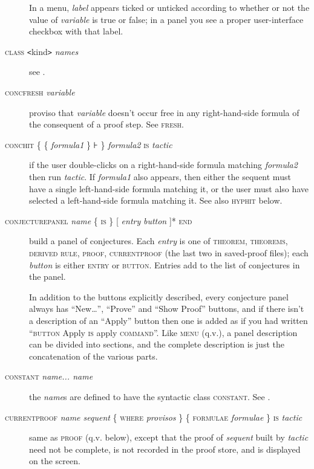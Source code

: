 \begin{description}
In a menu, \textit{label} appears ticked or unticked according to whether or not the value of \textit{variable} is true or false; in a panel you see a proper user-interface checkbox with that label.

\item[\textsc{class}  \texttt{<}kind\texttt{>} \textit{names}] see .

\item[\textsc{concfresh} \textit{variable}] proviso that \textit{variable} doesn't occur free in any right-hand-side formula of the consequent of a proof step. See \textsc{fresh}.

\item[\textsc{conchit} \{ \{ \textit{formula1} \} ⊦ \} \textit{formula2} \textsc{is} \textit{tactic}] if the user double-clicks on a right-hand-side formula matching \textit{formula2} then run \textit{tactic}. If \textit{formula1} also appears, then either the sequent must have a single left-hand-side formula matching it, or the user must also have selected a left-hand-side formula matching it. See also \textsc{hyphit} below.

\item[\textsc{conjecturepanel} \textit{name} \{ \textsc{is} \} {[} \textit{entry} {\textbar} \textit{button} {]}* \textsc{end}] build a panel of conjectures. Each \textit{entry} is one of \textsc{theorem, theorems, derived rule, proof, currentproof} (the last two in saved-proof files); each \textit{button} is either \textsc{entry} or \textsc{button}. Entries add to the list of conjectures in the panel. 

In addition to the buttons explicitly described, every conjecture panel always has ``New\dots'', ``Prove'' and ``Show Proof'' buttons, and if there isn't a description of an ``Apply'' button then one is added as if you had written ``\textsc{button} Apply \textsc{is} apply \textsc{command}''. Like \textsc{menu} (q.v.), a panel description can be divided into sections, and the complete description is just the concatenation of the various parts.

\item[\textsc{constant} \textit{name... name}] the \textit{name}s are defined to have the syntactic class \textsc{constant}. See .

\item[\textsc{currentproof} \textit{name sequent} \{ \textsc{where} \textit{provisos} \} \{ \textsc{formulae} \textit{formulae} \} \textsc{is} \textit{tactic}] same as \textsc{proof} (q.v. below), except that the proof of \textit{sequent} built by \textit{tactic} need not be complete, is not recorded in the proof store, and is displayed on the screen.


\end{description}
